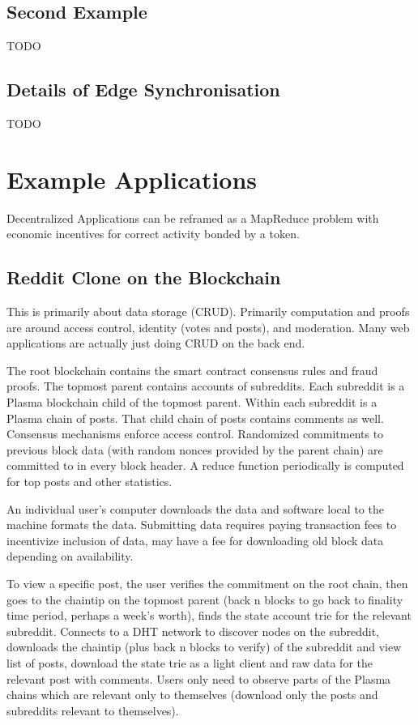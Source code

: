 \documentclass[letterpaper, 11pt]{article}
\begin{document}
\subsection{Second Example}

TODO

\subsection{Details of Edge Synchronisation}

TODO
	

\section{Example Applications}

Decentralized Applications can be reframed as a MapReduce problem with economic
incentives for correct activity bonded by a token.

\subsection{Reddit Clone on the Blockchain}

This is primarily about data storage (CRUD). Primarily computation and proofs
are around access control, identity (votes and posts), and moderation. Many web
applications are actually just doing CRUD on the back end.

The root blockchain contains the smart contract consensus rules and fraud
proofs. The topmost parent contains accounts of subreddits. Each subreddit is a
Plasma blockchain child of the topmost parent. Within each subreddit is a Plasma
chain of posts. That child chain of posts contains comments as well. Consensus
mechanisms enforce access control. Randomized commitments to previous block data
(with random nonces provided by the parent chain) are committed to in every
block header. A reduce function periodically is computed for top posts and other
statistics.

An individual user's computer downloads the data and software local to the
machine formats the data. Submitting data requires paying transaction fees to
incentivize inclusion of data, may have a fee for downloading old block data
depending on availability.

To view a specific post, the user verifies the commitment on the root chain,
then goes to the chaintip on the topmost parent (back n blocks to go back to
finality time period, perhaps a week's worth), finds the state account trie for
the relevant subreddit. Connects to a DHT network to discover nodes on the
subreddit, downloads the chaintip (plus back n blocks to verify) of the
subreddit and view list of posts, download the state trie as a light client and
raw data for the relevant post with comments. Users only need to observe parts
of the Plasma chains which are relevant only to themselves (download only the
posts and subreddits relevant to themselves).
\end{document}
